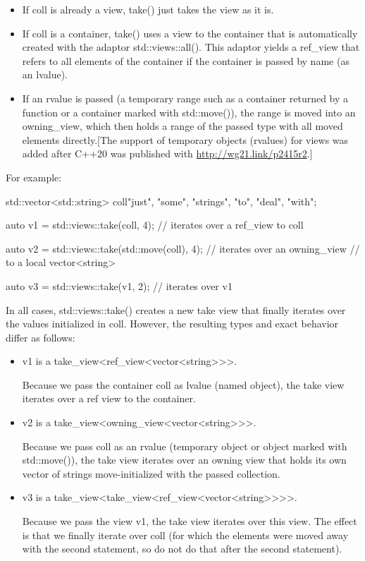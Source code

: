 \begin{itemize}
\item
If coll is already a view, take() just takes the view as it is.

\item
If coll is a container, take() uses a view to the container that is automatically created with the adaptor std::views::all(). This adaptor yields a ref\_view that refers to all elements of the container if the container is passed by name (as an lvalue).

\item
If an rvalue is passed (a temporary range such as a container returned by a function or a container marked with std::move()), the range is moved into an owning\_view, which then holds a range of the passed type with all moved elements directly.[The support of temporary objects (rvalues) for views was added after C++20 was published with \url{http://wg21.link/p2415r2}.]
\end{itemize}

For example:

\begin{cpp}
std::vector<std::string> coll{"just", "some", "strings", "to", "deal", "with"};

auto v1 = std::views::take(coll, 4); // iterates over a ref_view to coll

auto v2 = std::views::take(std::move(coll), 4); // iterates over an owning_view
// to a local vector<string>

auto v3 = std::views::take(v1, 2); // iterates over v1
\end{cpp}

In all cases, std::views::take() creates a new take view that finally iterates over the values initialized in coll. However, the resulting types and exact behavior differ as follows:

\begin{itemize}
\item
v1 is a take\_view<ref\_view<vector<string>{}>{}>.

Because we pass the container coll as lvalue (named object), the take view iterates over a ref view to the container.

\item
v2 is a take\_view<owning\_view<vector<string>{}>{}>.

Because we pass coll as an rvalue (temporary object or object marked with std::move()), the take view iterates over an owning view that holds its own vector of strings move-initialized with the passed collection.

\item
v3 is a take\_view<take\_view<ref\_view<vector<string>{}>{}>{}>.

Because we pass the view v1, the take view iterates over this view. The effect is that we finally iterate over coll (for which the elements were moved away with the second statement, so do not do that after the second statement).
\end{itemize}

